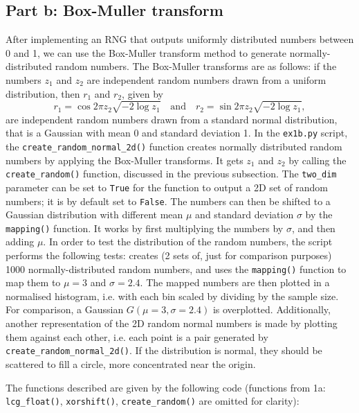 \documentclass{article}
\begin{document}
\subsection{Part b: Box-Muller transform}
After implementing an RNG that outputs uniformly distributed numbers between 0 and 1, we can use the Box-Muller transform method to generate normally-distributed random numbers. The Box-Muller transforms are as follows: if the numbers $z_1$ and $z_2$ are independent random numbers drawn from a uniform distribution, then $r_1$ and $r_2$, given by
\begin{equation}
    r_1 = \cos{2\pi z_2}\sqrt{-2\log{z_1}} \quad \text{and}  \quad
    r_2 = \sin{2\pi z_2}\sqrt{-2\log{z_1}},
\end{equation}
are independent random numbers drawn from a standard normal distribution, that is a Gaussian with mean 0 and standard deviation 1. In the \verb+ex1b.py+ script, the \verb+create_random_normal_2d()+ function creates normally distributed random numbers by applying the Box-Muller transforms. It gets $z_1$ and $z_2$ by calling the \verb+create_random()+ function, discussed in the previous subsection. The \verb+two_dim+ parameter can be set to \verb+True+ for the function to output a 2D set of random numbers; it is by default set to \verb+False+. The numbers can then be shifted to a Gaussian distribution with different mean $\mu$ and standard deviation $\sigma$ by the \verb+mapping()+ function. It works by first multiplying the numbers by $\sigma$, and then adding $\mu$. In order to test the distribution of the random numbers, the script performs the following tests: creates (2 sets of, just for comparison purposes) 1000 normally-distributed random numbers, and uses the \verb+mapping()+ function to map them to $\mu = 3$ and $\sigma=2.4$. The mapped numbers are then plotted in a normalised histogram, i.e. with each bin scaled by dividing by the sample size. For comparison, a Gaussian $G(\mu=3, \sigma=2.4)$ is overplotted. Additionally, another representation of the 2D random normal numbers is made by plotting them against each other, i.e. each point is a pair generated by \verb+create_random_normal_2d()+. If the distribution is normal, they should be scattered to fill a circle, more concentrated near the origin. 

The functions described are given by the following code (functions from 1a: \verb+lcg_float()+, \verb+xorshift()+, \verb+create_random()+ are omitted for clarity):

\end{document}
